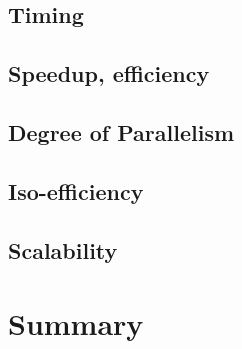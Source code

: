 %
%
%

%


%
%
%
%
%
%
\subsection{Timing}
%
\subsection{Speedup, efficiency}


%
\subsection{Degree of Parallelism}
%
\subsection{Iso-efficiency}
%
\subsection{Scalability}
%
%
%
%
%
\section{Summary}
%
